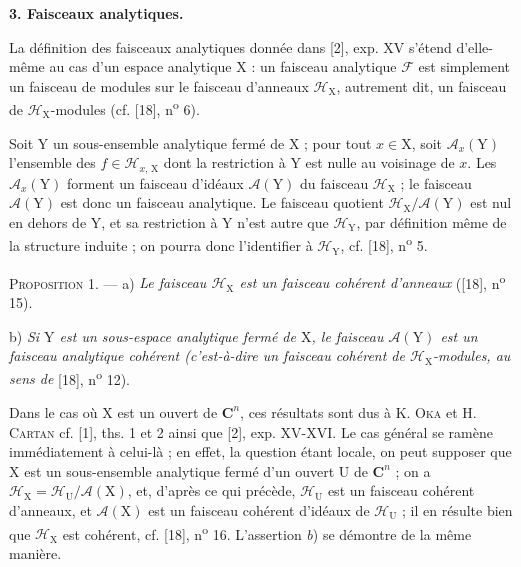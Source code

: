 \textbf{3. Faisceaux analytiques.}

La définition des faisceaux analytiques donnée dans [2], exp. XV s'étend d'elle-même au cas d'un espace analytique $\mathrm{X}$ : un faisceau analytique $\mathcal{F}$ est simplement un faisceau de modules sur le faisceau d'anneaux $\mathcal{H}_{\mathrm{X}}$, autrement dit, un faisceau de $\mathcal{H}_{\mathrm{X}}$-modules (cf. [18], n\textsuperscript{o} 6).

Soit $\mathrm{Y}$ un sous-ensemble analytique fermé de $\mathrm{X}$ ; pour tout $x \in \mathrm{X}$, soit $\mathcal{A}_x(\mathrm{Y})$ l'ensemble des $f \in \mathcal{H}_{x,\,\mathrm{X}}$ dont la restriction à $\mathrm{Y}$ est nulle au voisinage de $x$. Les $\mathcal{A}_x(\mathrm{Y})$ forment un faisceau d'idéaux $\mathcal{A}(\mathrm{Y})$ du faisceau $\mathcal{H}_{\mathrm{X}}$ ; le faisceau $\mathcal{A}(\mathrm{Y})$ est donc un faisceau analytique. Le faisceau quotient $\mathcal{H}_{\mathrm{X}}/\mathcal{A}(\mathrm{Y})$ est nul en dehors de $\mathrm{Y}$, et sa restriction à $\mathrm{Y}$ n'est autre que $\mathcal{H}_{\mathrm{Y}}$, par définition même de la structure induite ; on pourra donc l'identifier à $\mathcal{H}_{\mathrm{Y}}$, cf. [18], n\textsuperscript{o} 5.

\textsc{Proposition} 1. --- a) \textit{Le faisceau $\mathcal{H}_{\mathrm{X}}$ est un faisceau cohérent d'anneaux} ([18], n\textsuperscript{o} 15).

b) \textit{Si $\mathrm{Y}$ est un sous-espace analytique fermé de $\mathrm{X}$, le faisceau $\mathcal{A}(\mathrm{Y})$ est un faisceau analytique cohérent (c'est-à-dire un faisceau cohérent de $\mathcal{H}_{\mathrm{X}}$-modules, au sens de} [18], n\textsuperscript{o} 12).



Dans le cas où $\mathrm{X}$ est un ouvert de $\mathbf{C}^n$, ces résultats sont dus à K. \textsc{Oka} et H. \textsc{Cartan} cf. [1], ths. 1 et 2 ainsi que [2], exp. XV-XVI. Le cas général se ramène immédiatement à celui-là ; en effet, la question étant locale, on peut supposer que $\mathrm{X}$ est un sous-ensemble analytique fermé d'un ouvert $\mathrm{U}$ de $\mathbf{C}^n$ ; on a $\mathcal{H}_{\mathrm{X}} = \mathcal{H}_{\mathrm{U}}/\mathcal{A}(\mathrm{X})$, et, d'après ce qui précède, $\mathcal{H}_{\mathrm{U}}$ est un faisceau cohérent d'anneaux, et $\mathcal{A}(\mathrm{X})$ est un faisceau cohérent d'idéaux de $\mathcal{H}_{\mathrm{U}}$ ; il en résulte bien que $\mathcal{H}_{\mathrm{X}}$ est cohérent, cf. [18], n\textsuperscript{o} 16. L'assertion \textit{b}) se démontre de la même manière.

